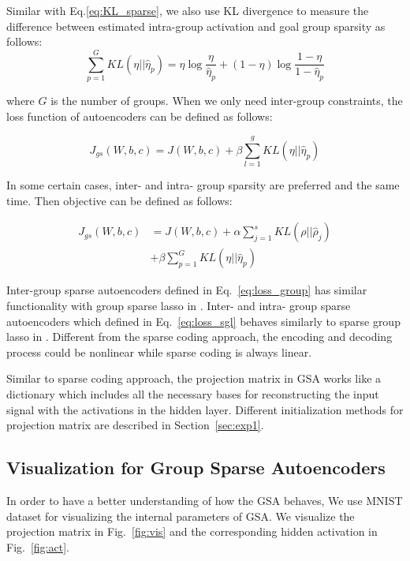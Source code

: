 Similar with Eq.\ref{eq:KL_sparse}, we also use KL divergence to measure the difference between estimated intra-group activation and goal group sparsity as follows:
\begin{equation}\label{eq:KL_grop}
    \sum_{p=1}^G KL(\eta||\hat{\eta}_p) = \eta\log\frac{\eta}{\hat{\eta}_p} + (1-\eta)\log\frac{1-\eta}{1-\hat{\eta}_p}
\end{equation}

\noindent where $G$ is the number of groups. When we only need inter-group constraints, the loss function of autoencoders can be defined as follows: 

\begin{equation}\label{eq:loss_group}
    J_{gs}(W,b,c) = J(W,b,c) + \beta \sum_{l=1}^g KL(\eta||\hat{\eta}_p)
\end{equation}

In some certain cases, inter- and intra- group sparsity are preferred and the same time. Then objective can be defined as follows: 


\begin{equation}\label{eq:loss_sgl}
\begin{split}
J_{gs}(W,b,c) &= J(W,b,c) + \alpha \sum_{j=1}^s KL(\rho||\hat{\rho}_j) \\
& + \beta \sum_{p=1}^G KL(\eta||\hat{\eta}_p)
\end{split}
\end{equation}

Inter-group sparse autoencoders defined in Eq.~\ref{eq:loss_group} has similar functionality with group sparse lasso in \cite{Yuan06modelselection}. Inter- and intra- group sparse autoencoders which defined in Eq.~\ref{eq:loss_sgl} behaves similarly to sparse group lasso in \cite{Simon13asparse-group}. Different from the sparse coding approach, the encoding and decoding process could be nonlinear while sparse coding is always linear. 

Similar to sparse coding approach, the projection matrix in GSA works like a dictionary which includes all the necessary bases for reconstructing the input signal with the activations in the hidden layer. Different initialization methods for projection matrix are described in Section~\ref{sec:exp1}.  










\subsection{Visualization for Group Sparse Autoencoders}
In order to have a better understanding of how the GSA behaves, 
We use MNIST dataset for visualizing the internal parameters of GSA.
We visualize the projection matrix in Fig.~\ref{fig:vis} and the corresponding hidden activation in Fig.~\ref{fig:act}. 



